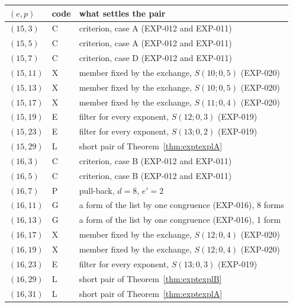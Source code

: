 \begin{tabular}{@{}ll>{\raggedright\arraybackslash}p{9.8cm}@{}}
\toprule
$(e,p)$ & code & what settles the pair\\
\midrule
$(15,3)$ & C & criterion, case A (EXP-012 and EXP-011)\\
$(15,5)$ & C & criterion, case A (EXP-012 and EXP-011)\\
$(15,7)$ & C & criterion, case D (EXP-012 and EXP-011)\\
$(15,11)$ & X & member fixed by the exchange, $S(10;0,5)$ (EXP-020)\\
$(15,13)$ & X & member fixed by the exchange, $S(10;0,5)$ (EXP-020)\\
$(15,17)$ & X & member fixed by the exchange, $S(11;0,4)$ (EXP-020)\\
$(15,19)$ & E & filter for every exponent, $S(12;0,3)$ (EXP-019)\\
$(15,23)$ & E & filter for every exponent, $S(13;0,2)$ (EXP-019)\\
$(15,29)$ & L & short pair of Theorem~\ref{thm:exptexplA}\\
$(16,3)$ & C & criterion, case B (EXP-012 and EXP-011)\\
$(16,5)$ & C & criterion, case B (EXP-012 and EXP-011)\\
$(16,7)$ & P & pull-back, $d=8$, $e'=2$\\
$(16,11)$ & G & a form of the list by one congruence (EXP-016), 8 forms\\
$(16,13)$ & G & a form of the list by one congruence (EXP-016), 1 form\\
$(16,17)$ & X & member fixed by the exchange, $S(12;0,4)$ (EXP-020)\\
$(16,19)$ & X & member fixed by the exchange, $S(12;0,4)$ (EXP-020)\\
$(16,23)$ & E & filter for every exponent, $S(13;0,3)$ (EXP-019)\\
$(16,29)$ & L & short pair of Theorem~\ref{thm:exptexplB}\\
$(16,31)$ & L & short pair of Theorem~\ref{thm:exptexplA}\\
\bottomrule
\end{tabular}
